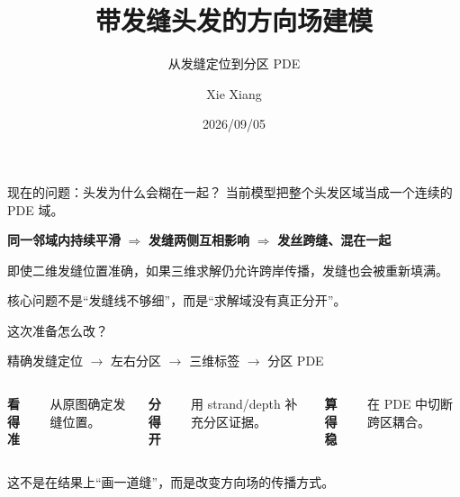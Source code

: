 \documentclass[10pt,aspectratio=169]{beamer}
\title{带发缝头发的方向场建模}
\subtitle{从发缝定位到分区 PDE}
\author{Xie Xiang}
\date{2026/09/05}
\newcommand{\result}[1]{\textcolor{blue!70!black}{#1}}
\begin{document}
\maketitle

\begin{frame}{现在的问题：头发为什么会糊在一起？}
\Large
当前模型把整个头发区域当成一个连续的 PDE 域。

\vspace{0.8em}
\begin{center}
\textbf{同一邻域内持续平滑}
\quad$\Longrightarrow$\quad
\textbf{发缝两侧互相影响}
\quad$\Longrightarrow$\quad
\textbf{发丝跨缝、混在一起}
\end{center}

\vspace{1em}
\normalsize
即使二维发缝位置准确，如果三维求解仍允许跨岸传播，发缝也会被重新填满。

\vfill
\centering
\result{核心问题不是“发缝线不够细”，而是“求解域没有真正分开”。}
\end{frame}

\begin{frame}{这次准备怎么改？}
\begin{center}
\Large
精确发缝定位
$\longrightarrow$
左右分区
$\longrightarrow$
三维标签
$\longrightarrow$
分区 PDE
\end{center}

\vspace{1.4em}
\begin{columns}[T]
\textbf{看得准}

从原图确定发缝位置。

\textbf{分得开}

用 strand/depth 补充分区证据。

\textbf{算得稳}

在 PDE 中切断跨区耦合。
\end{columns}

\vfill
\centering
这不是在结果上“画一道缝”，而是改变方向场的传播方式。
\end{frame}
\end{document}

